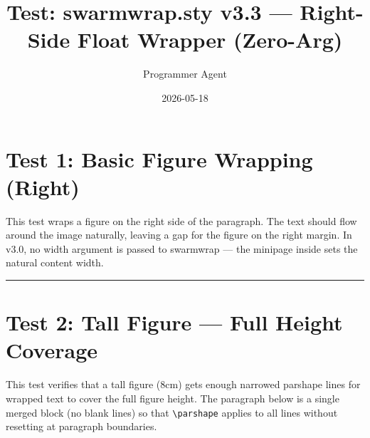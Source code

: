 \documentclass[a4paper,11pt]{article}
\title{Test: swarmwrap.sty v3.3 — Right-Side Float Wrapper (Zero-Arg)}
\author{Programmer Agent}
\date{2026-05-18}
\begin{document}
\maketitle

\section*{Test 1: Basic Figure Wrapping (Right)}
This test wraps a figure on the right side of the paragraph. The text should flow
around the image naturally, leaving a gap for the figure on the right margin.
In v3.0, no width argument is passed to swarmwrap — the minipage inside
sets the natural content width.

\begin{swarmwrap}%
  \begin{minipage}[t]{3cm}
    \centering
    \rule{\linewidth}{3.8cm}
    \label{fig:right}
  \end{minipage}%
\end{swarmwrap}%
\swarmwrapnext
\lipsum[1-2]

\newpage
\section*{Test 2: Tall Figure — Full Height Coverage}
This test verifies that a tall figure (8cm) gets enough narrowed parshape
lines for wrapped text to cover the full figure height. The paragraph below
is a single merged block (no blank lines) so that \texttt{\textbackslash parshape}
applies to all lines without resetting at paragraph boundaries.
\end{document}
